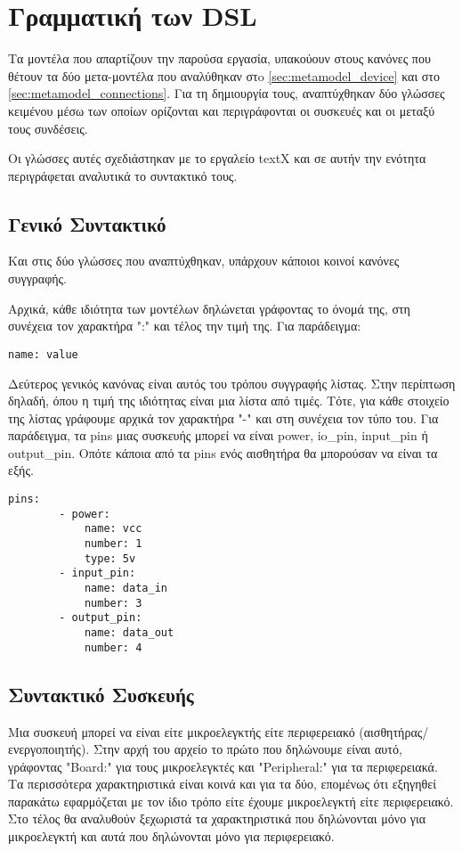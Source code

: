 \section{Γραμματική των DSL}
\label{sec:dsl}

Τα μοντέλα που απαρτίζουν την παρούσα εργασία, υπακούουν στους κανόνες που θέτουν τα δύο μετα-μοντέλα που αναλύθηκαν στo \autoref{sec:metamodel_device} και στο \autoref{sec:metamodel_connections}. Για τη δημιουργία τους, αναπτύχθηκαν δύο γλώσσες κειμένου μέσω των οποίων ορίζονται και περιγράφονται οι συσκευές και οι μεταξύ τους συνδέσεις.

Οι γλώσσες αυτές σχεδιάστηκαν με το εργαλείο textX και σε αυτήν την ενότητα περιγράφεται αναλυτικά το συντακτικό τους.

\subsection{Γενικό Συντακτικό}
\label{subsec:syntax}
Και στις δύο γλώσσες που αναπτύχθηκαν, υπάρχουν κάποιοι κοινοί κανόνες συγγραφής.

Αρχικά, κάθε ιδιότητα των μοντέλων δηλώνεται γράφοντας το όνομά της, στη συνέχεια τον χαρακτήρα ":" και τέλος την τιμή της. Για παράδειγμα:

\begin{lstlisting}[title={Παράδειγμα ανάθεσης τιμής σε ιδιότητα}]
	name: value
\end{lstlisting}

Δεύτερος γενικός κανόνας είναι αυτός του τρόπου συγγραφής λίστας. Στην περίπτωση δηλαδή, όπου η τιμή της ιδιότητας είναι μια λίστα από τιμές. Τότε, για κάθε στοιχείο της λίστας γράφουμε αρχικά τον χαρακτήρα "-" και στη συνέχεια τον τύπο του. Για παράδειγμα, τα pins μιας συσκευής μπορεί να είναι power, io\_pin, input\_pin ή output\_pin. Οπότε κάποια από τα pins ενός αισθητήρα θα μπορούσαν να είναι τα εξής.

\begin{lstlisting}[title={Παράδειγμα ορισμού pins αισθητήρα}]
	pins:
		- power:
			name: vcc
			number: 1
			type: 5v
		- input_pin:
			name: data_in
			number: 3
		- output_pin:
			name: data_out
			number: 4
\end{lstlisting}

\subsection{Συντακτικό Συσκευής}
\label{subsec:syntax_device}

Μια συσκευή μπορεί να είναι είτε μικροελεγκτής είτε περιφερειακό (αισθητήρας/ενεργοποιητής). Στην αρχή του αρχείο το πρώτο που δηλώνουμε είναι αυτό, γράφοντας "Board:" για τους μικροελεγκτές και "Peripheral:" για τα περιφερειακά. Τα περισσότερα χαρακτηριστικά είναι κοινά και για τα δύο, επομένως ότι εξηγηθεί παρακάτω εφαρμόζεται με τον ίδιο τρόπο είτε έχουμε μικροελεγκτή είτε περιφερειακό. Στο τέλος θα αναλυθούν ξεχωριστά τα χαρακτηριστικά που δηλώνονται μόνο για μικροελεγκτή και αυτά που δηλώνονται μόνο για περιφερειακό.

